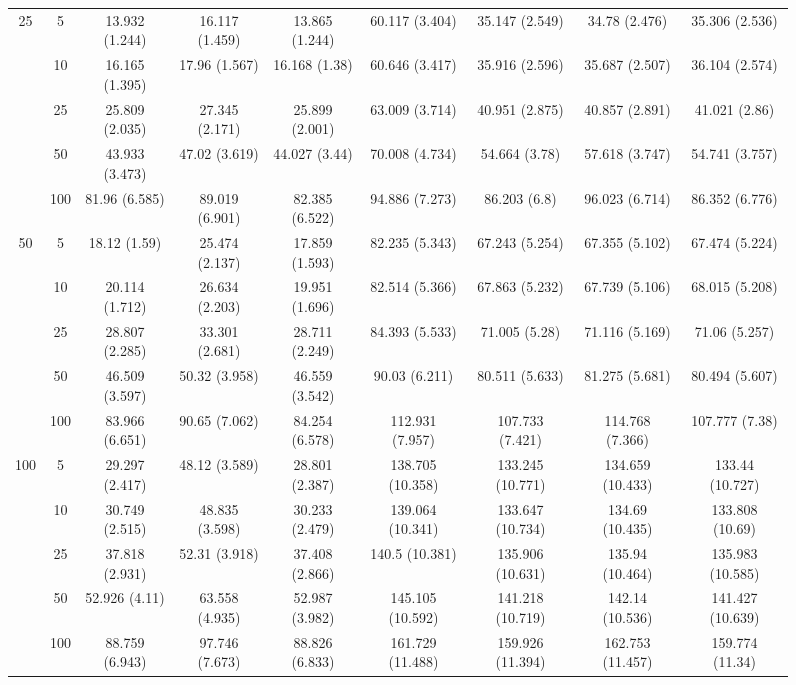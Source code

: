 \documentclass[10pt]{article}
\theoremstyle{definition}
\begin{document}
\begin{sidewaysfigure}
\begin{tabular}{cc|ccc|cccc}
  \multirow{5}{*}{25}  & 5 & 13.932 (1.244) & 16.117 (1.459) & 13.865 (1.244) & 60.117 (3.404) & 35.147 (2.549) & 34.78 (2.476) & 35.306 (2.536) \\ 
    & 10 & 16.165 (1.395) & 17.96 (1.567) & 16.168 (1.38) & 60.646 (3.417) & 35.916 (2.596) & 35.687 (2.507) & 36.104 (2.574) \\ 
    & 25 & 25.809 (2.035) & 27.345 (2.171) & 25.899 (2.001) & 63.009 (3.714) & 40.951 (2.875) & 40.857 (2.891) & 41.021 (2.86) \\ 
    & 50 & 43.933 (3.473) & 47.02 (3.619) & 44.027 (3.44) & 70.008 (4.734) & 54.664 (3.78) & 57.618 (3.747) & 54.741 (3.757) \\ 
    & 100 & 81.96 (6.585) & 89.019 (6.901) & 82.385 (6.522) & 94.886 (7.273) & 86.203 (6.8) & 96.023 (6.714) & 86.352 (6.776) \\[.3cm] 
   \multirow{5}{*}{50}  & 5 & 18.12 (1.59) & 25.474 (2.137) & 17.859 (1.593) & 82.235 (5.343) & 67.243 (5.254) & 67.355 (5.102) & 67.474 (5.224) \\ 
    & 10 & 20.114 (1.712) & 26.634 (2.203) & 19.951 (1.696) & 82.514 (5.366) & 67.863 (5.232) & 67.739 (5.106) & 68.015 (5.208) \\ 
    & 25 & 28.807 (2.285) & 33.301 (2.681) & 28.711 (2.249) & 84.393 (5.533) & 71.005 (5.28) & 71.116 (5.169) & 71.06 (5.257) \\ 
    & 50 & 46.509 (3.597) & 50.32 (3.958) & 46.559 (3.542) & 90.03 (6.211) & 80.511 (5.633) & 81.275 (5.681) & 80.494 (5.607) \\ 
    & 100 & 83.966 (6.651) & 90.65 (7.062) & 84.254 (6.578) & 112.931 (7.957) & 107.733 (7.421) & 114.768 (7.366) & 107.777 (7.38) \\[.3cm] 
   \multirow{5}{*}{100}  & 5 & 29.297 (2.417) & 48.12 (3.589) & 28.801 (2.387) & 138.705 (10.358) & 133.245 (10.771) & 134.659 (10.433) & 133.44 (10.727) \\ 
    & 10 & 30.749 (2.515) & 48.835 (3.598) & 30.233 (2.479) & 139.064 (10.341) & 133.647 (10.734) & 134.69 (10.435) & 133.808 (10.69) \\ 
    & 25 & 37.818 (2.931) & 52.31 (3.918) & 37.408 (2.866) & 140.5 (10.381) & 135.906 (10.631) & 135.94 (10.464) & 135.983 (10.585) \\ 
    & 50 & 52.926 (4.11) & 63.558 (4.935) & 52.987 (3.982) & 145.105 (10.592) & 141.218 (10.719) & 142.14 (10.536) & 141.427 (10.639) \\ 
    & 100 & 88.759 (6.943) & 97.746 (7.673) & 88.826 (6.833) & 161.729 (11.488) & 159.926 (11.394) & 162.753 (11.457) & 159.774 (11.34) \\ 
\end{tabular}
\end{sidewaysfigure}
\end{document}
